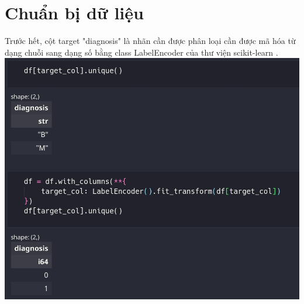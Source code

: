 \section{Chuẩn bị dữ liệu}
Trước hết, cột target "diagnosis" là nhãn cần được phân loại cần được mã hóa từ dạng chuỗi sang dạng số bằng class LabelEncoder của thư viện scikit-learn \cite{scikit-learn}.
\includegraphics[width=\linewidth]{img/encode.jpeg}

